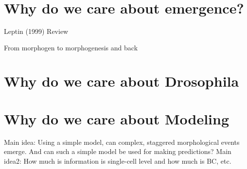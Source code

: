 \section{Why do we care about emergence?}
Leptin (1999) Review

From morphogen to morphogenesis and back
\section{Why do we care about Drosophila}
\section{Why do we care about Modeling}
Main idea: Using a simple model, can complex, staggered morphological events emerge. And can such a simple model be used for making predictions?
Main idea2: How much is information is single-cell level and how much is BC, etc.